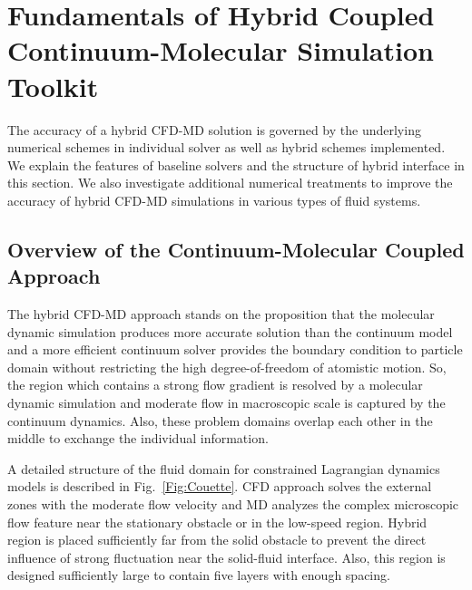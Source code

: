 \documentclass[preprint,12pt]{elsarticle}
\begin{document}
\section{Fundamentals of Hybrid Coupled Continuum-Molecular Simulation Toolkit}
\label{sec:numerical}

The accuracy of a hybrid CFD-MD solution is governed by the underlying numerical schemes in individual solver as well as hybrid schemes implemented. We explain the features of baseline solvers and the structure of hybrid interface in this section. We also investigate additional numerical treatments to improve the accuracy of hybrid CFD-MD simulations in various types of fluid systems.

\subsection{Overview of the Continuum-Molecular Coupled Approach}
The hybrid CFD-MD approach stands on the proposition that the molecular dynamic simulation produces more accurate solution than the continuum model and a more efficient continuum solver provides the boundary condition to particle domain without restricting the high degree-of-freedom of atomistic motion. So, the region which contains a strong flow gradient is resolved by a molecular dynamic simulation and moderate flow in macroscopic scale is captured by the continuum dynamics. Also, these problem domains overlap each other in the middle to exchange the individual information.

A detailed structure of the fluid domain for constrained Lagrangian dynamics models is described in Fig.~\ref{Fig:Couette}. CFD approach solves the external zones with the moderate flow velocity and MD analyzes the complex microscopic flow feature near the stationary obstacle or in the low-speed region. Hybrid region is placed sufficiently far from the solid obstacle to prevent the direct influence of strong fluctuation near the solid-fluid interface. Also, this region is designed sufficiently large to contain five layers with enough spacing.
\end{document}
